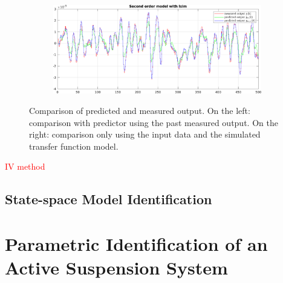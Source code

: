 \documentclass{scrartcl}
\newcommand*{\matlabcode}[3]{\begin{figure}[h!]\end{figure}}
\begin{document}
\begin{figure}[h]
\begin{subfigure}{.49\textwidth}
		\label{fig:output_lsim2}
	\end{subfigure}
	\begin{subfigure}{\textwidth}
		\vspace*{1cm}
		\includegraphics[width=\textwidth]{figures/arx_iv.pdf}

	\end{subfigure}
	\caption{Comparison of predicted and measured output. On the left: comparison with predictor using the past measured output. On the right: comparison only using the input data and the simulated transfer function model.}
\end{figure}

\matlabcode{../matlab/ce2/ARX_model_identification.m}{Matlab function for the ARX model identification technique.}{lst:FIR}

\textcolor{red}{IV method}


\subsection{State-space Model Identification}

\newpage
\section{Parametric Identification of an Active Suspension System}
\end{document}
